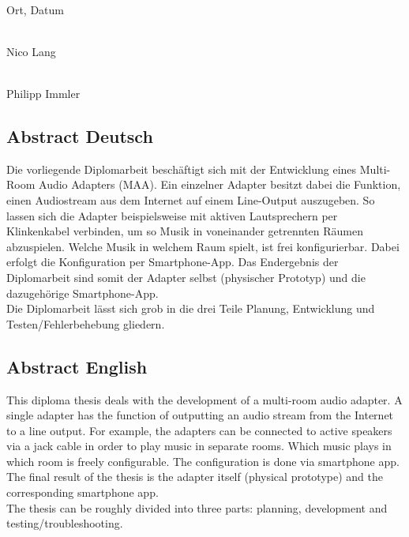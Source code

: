 \documentclass[11pt, twoside]{article}
\begin{document}
\vspace{30mm}

\noindent
\begin{minipage}[c]{5cm}
	\centering \dotfill \\
	Ort, Datum
\end{minipage}
\hfill
    \begin{minipage}[c]{5cm}
        \centering \dotfill \\
        Nico Lang
    \end{minipage}
    
\vspace{25mm}

\noindent
\begin{flushright}
    \begin{minipage}[c]{5cm}
        \centering \dotfill \\
        Philipp Immler
    \end{minipage}
\end{flushright}

\newpage

\subsection*{Abstract Deutsch}
Die vorliegende Diplomarbeit beschäftigt sich mit der Entwicklung eines Multi-Room Audio Adapters (MAA). Ein einzelner Adapter besitzt dabei die Funktion, einen Audiostream aus dem Internet auf einem Line-Output auszugeben. So lassen sich die Adapter beispielsweise mit aktiven Lautsprechern per Klinkenkabel verbinden, um so Musik in voneinander getrennten Räumen abzuspielen. Welche Musik in welchem Raum spielt, ist frei konfigurierbar. Dabei erfolgt die Konfiguration per Smartphone-App. Das Endergebnis der Diplomarbeit sind somit der Adapter selbst (physischer Prototyp) und die dazugehörige Smartphone-App. \newline \\
Die Diplomarbeit lässt sich grob in die drei Teile Planung, Entwicklung und Testen/Fehlerbehebung gliedern.
\subsection*{Abstract English}
This diploma thesis deals with the development of a multi-room audio adapter. A single adapter has the function of outputting an audio stream from the Internet to a line output. For example, the adapters can be connected to active speakers via a jack cable in order to play music in separate rooms. Which music plays in which room is freely configurable. The configuration is done via smartphone app. The final result of the thesis is the adapter itself (physical prototype) and the corresponding smartphone app. \newline \\
The thesis can be roughly divided into three parts: planning, development and testing/troubleshooting.
\end{document}
